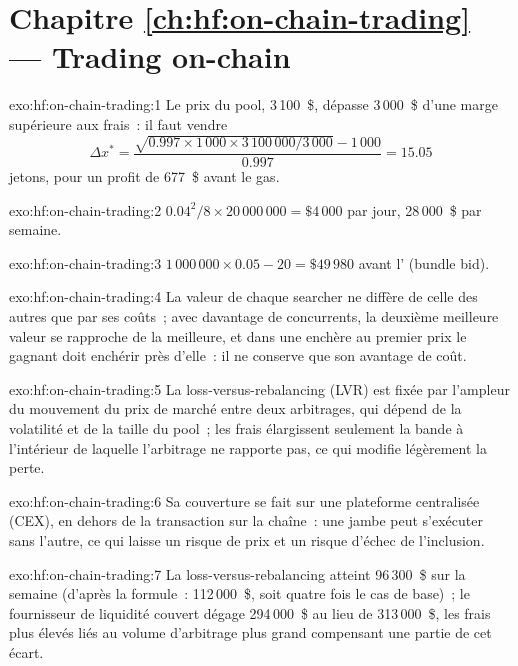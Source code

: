 \section*{Chapitre \ref{ch:hf:on-chain-trading} --- Trading on-chain}

\begin{solution}{exo:hf:on-chain-trading:1}
Le prix du pool, 3\,100~\$, dépasse 3\,000~\$ d'une marge supérieure aux frais~: il faut vendre
\[
\Delta x^\ast=\frac{\sqrt{0.997\times1\,000\times3\,100\,000/3\,000}-1\,000}{0.997}=15.05
\]
jetons, pour un profit de 677~\$ avant le gas.
\end{solution}

\begin{solution}{exo:hf:on-chain-trading:2}
$0.04^2/8\times20\,000\,000=\$4\,000$ par jour, 28\,000~\$ par semaine.
\end{solution}

\begin{solution}{exo:hf:on-chain-trading:3}
$1\,000\,000\times0.05-20=\$49\,980$ avant l' (bundle bid).
\end{solution}

\begin{solution}{exo:hf:on-chain-trading:4}
La valeur de chaque searcher ne diffère de celle des autres que par ses coûts~; avec davantage de concurrents, la deuxième meilleure valeur se
rapproche de la meilleure, et dans une enchère au premier prix le gagnant doit enchérir près d'elle~: il ne conserve que son avantage de coût.
\end{solution}

\begin{solution}{exo:hf:on-chain-trading:5}
La loss-versus-rebalancing (LVR) est fixée par l'ampleur du mouvement du prix de marché entre deux arbitrages, qui dépend de la volatilité et de la
taille du pool~; les frais élargissent seulement la bande à l'intérieur de laquelle l'arbitrage ne rapporte pas, ce qui modifie légèrement la perte.
\end{solution}

\begin{solution}{exo:hf:on-chain-trading:6}
Sa couverture se fait sur une plateforme centralisée (CEX), en dehors de la transaction sur la chaîne~: une jambe peut s'exécuter sans l'autre, ce qui laisse
un risque de prix et un risque d'échec de l'inclusion.
\end{solution}

\begin{solution}{exo:hf:on-chain-trading:7}
La loss-versus-rebalancing atteint 96\,300~\$ sur la semaine (d'après la formule~: 112\,000~\$, soit quatre fois le cas de base)~; le fournisseur de liquidité couvert dégage 294\,000~\$
au lieu de 313\,000~\$, les frais plus élevés liés au volume d'arbitrage plus grand compensant une partie de cet écart.
\end{solution}

